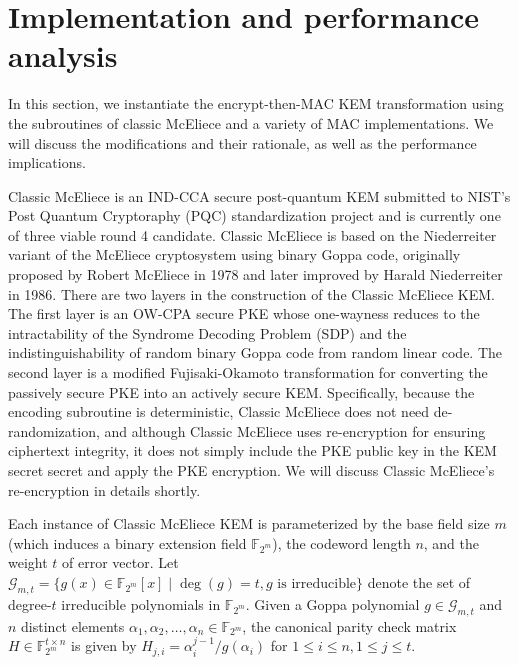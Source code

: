 \documentclass[runningheads]{llncs}
\begin{document}
\section{Implementation and performance analysis}\label{sec:implementation-and-performance-analysis}
In this section, we instantiate the encrypt-then-MAC KEM transformation using the subroutines of classic McEliece and a variety of MAC implementations. We will discuss the modifications and their rationale, as well as the performance implications.

Classic McEliece is an IND-CCA secure post-quantum KEM submitted to NIST's Post Quantum Cryptoraphy (PQC) standardization project and is currently one of three viable round 4 candidate. Classic McEliece is based on the Niederreiter variant of the McEliece cryptosystem using binary Goppa code, originally proposed by Robert McEliece in 1978 and later improved by Harald Niederreiter in 1986. There are two layers in the construction of the Classic McEliece KEM. The first layer is an OW-CPA secure PKE whose one-wayness reduces to the intractability of the Syndrome Decoding Problem (SDP) and the indistinguishability of random binary Goppa code from random linear code. The second layer is a modified Fujisaki-Okamoto transformation for converting the passively secure PKE into an actively secure KEM. Specifically, because the encoding subroutine is deterministic, Classic McEliece does not need de-randomization, and although Classic McEliece uses re-encryption for ensuring ciphertext integrity, it does not simply include the PKE public key in the KEM secret secret and apply the PKE encryption. We will discuss Classic McEliece's re-encryption in details shortly.

Each instance of Classic McEliece KEM is parameterized by the base field size $m$ (which induces a binary extension field $\mathbb{F}_{2^m}$), the codeword length $n$, and the weight $t$ of error vector. Let $\mathcal{G}_{m, t} = \{g(x) \in \mathbb{F}_{2^m}[x] \mid \deg(g) = t, \text{$g$ is irreducible}\}$ denote the set of degree-$t$ irreducible polynomials in $\mathbb{F}_{2^m}$. Given a Goppa polynomial $g \in \mathcal{G}_{m, t}$ and $n$ distinct elements $\alpha_1, \alpha_2, \ldots, \alpha_n \in \mathbb{F}_{2^m}$, the canonical parity check matrix $H \in \mathbb{F}_{2^m}^{t \times n}$ is given by $H_{j,i} = \alpha_i^{j-1}/g(\alpha_i)$ for $1\leq i \leq n, 1 \leq j \leq t$.
\end{document}
